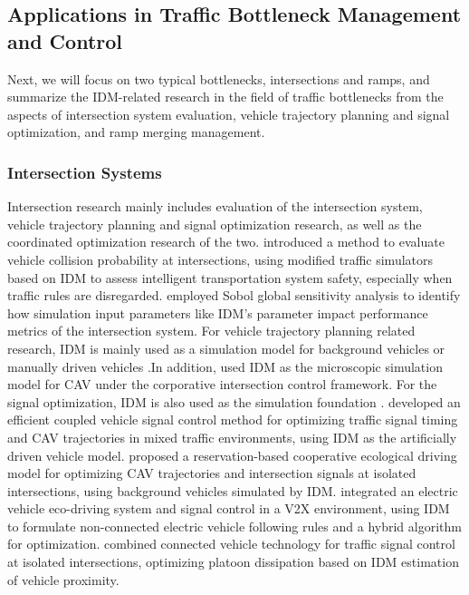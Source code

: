 \documentclass[a4paper,fleqn]{cas-sc}
\begin{document}
\subsection{Applications in Traffic Bottleneck Management and Control}

Next, we will focus on two typical bottlenecks, intersections and ramps, and summarize the IDM-related research in the field of traffic bottlenecks from the aspects of intersection system evaluation, vehicle trajectory planning and signal optimization, and ramp merging management.

\subsubsection{Intersection Systems}

Intersection research mainly includes evaluation of the intersection system, vehicle trajectory planning and signal optimization research, as well as the coordinated optimization research of the two. \cite{joererVehicularNetworkingPerspectiveEstimating2014a} introduced a method to evaluate vehicle collision probability at intersections, using modified traffic simulators based on IDM to assess intelligent transportation system safety, especially when traffic rules are disregarded. \cite{schrader_global_2024} employed Sobol global sensitivity analysis to identify how simulation input parameters like IDM's parameter impact performance metrics of the intersection system. For vehicle trajectory planning related research, IDM is mainly used as a simulation model for background vehicles or manually driven vehicles \citep{chen_human-like_2023,dong_comparative_2022,ghosh_traffic_2022,guoCoordinationConnectedAutomatedVehicles2023a,jiangEcoApproachingIsolatedSignalized2017a,medina_cooperative_2018,stebbinsCharacterisingGreenLightOptimal2017a,wang_learning_2023,xiaoDecisionMakingAutonomousVehiclesRandom2024a,zhangPlatoonCenteredControlEcoDrivingSignalized2023b,zhang_risk-aware_2023}.In addition,\cite{zhouCooperativeSignalFreeIntersectionControl2022b} used IDM as the microscopic simulation model for CAV under the corporative intersection control framework. For the signal optimization, IDM is also used as the simulation foundation \citep{cao_gain_2022,sohn_waterfilling_2023,yang_enhancing_2024}. \cite{duCoupledVehicleSignalControlMethod2021b} developed an efficient coupled vehicle signal control method for optimizing traffic signal timing and CAV trajectories in mixed traffic environments, using IDM as the artificially driven vehicle model. \cite{huang_reservation-based_2023} proposed a reservation-based cooperative ecological driving model for optimizing CAV trajectories and intersection signals at isolated intersections, using background vehicles simulated by IDM. \cite{liEcoDrivingSystemElectricVehicles2018a} integrated an electric vehicle eco-driving system and signal control in a V2X environment, using IDM to formulate non-connected electric vehicle following rules and a hybrid algorithm for optimization. \cite{liang_equitable_2020} combined connected vehicle technology for traffic signal control at isolated intersections, optimizing platoon dissipation based on IDM estimation of vehicle proximity.
\end{document}
